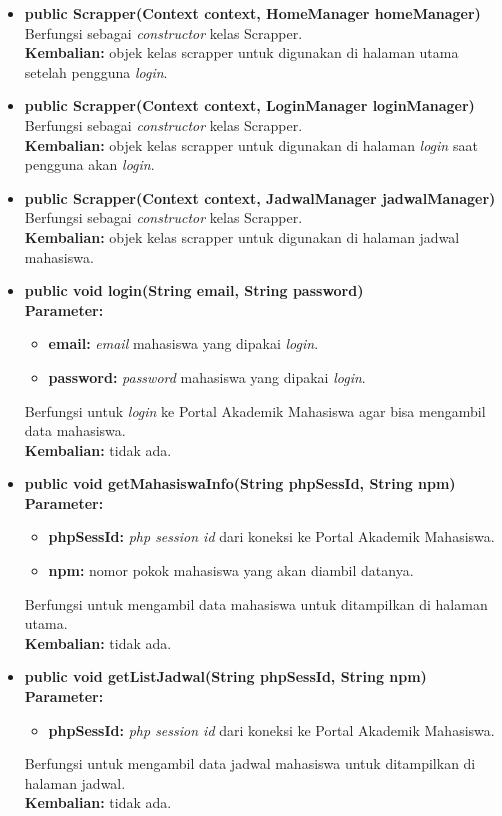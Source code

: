 \begin{enumerate}
\begin{itemize}
			\item \textbf{public Scrapper(Context context, HomeManager homeManager)}\\
				Berfungsi sebagai \textit{constructor} kelas Scrapper.\\
				\textbf{Kembalian:} objek kelas scrapper untuk digunakan di halaman utama setelah pengguna \textit{login}.
            \item \textbf{public Scrapper(Context context, LoginManager loginManager)}\\
				Berfungsi sebagai \textit{constructor} kelas Scrapper.\\
				\textbf{Kembalian:} objek kelas scrapper untuk digunakan di halaman \textit{login} saat pengguna akan \textit{login}.	
			\item \textbf{public Scrapper(Context context, JadwalManager jadwalManager)}\\
				Berfungsi sebagai \textit{constructor} kelas Scrapper.\\
				\textbf{Kembalian:} objek kelas scrapper untuk digunakan di halaman jadwal mahasiswa.
			\item \textbf{public void login(String email, String password)}\\
			\textbf{Parameter:}
				\begin{itemize}
					\item \textbf{email:} \textit{email} mahasiswa yang dipakai \textit{login}.
					\item \textbf{password:} \textit{password} mahasiswa yang dipakai \textit{login}.
				\end{itemize}
				Berfungsi untuk \textit{login} ke Portal Akademik Mahasiswa agar bisa mengambil data mahasiswa.\\
				\textbf{Kembalian:} tidak ada.
		    \item \textbf{public void getMahasiswaInfo(String phpSessId, String npm)}\\
			\textbf{Parameter:}
				\begin{itemize}
					\item \textbf{phpSessId:} \textit{php session id} dari koneksi ke Portal Akademik Mahasiswa.
					\item \textbf{npm:} nomor pokok mahasiswa yang akan diambil datanya.
				\end{itemize}
				Berfungsi untuk mengambil data mahasiswa untuk ditampilkan di halaman utama.\\
				\textbf{Kembalian:} tidak ada.
			\item \textbf{public void getListJadwal(String phpSessId, String npm)}\\
			\textbf{Parameter:}
				\begin{itemize}
					\item \textbf{phpSessId:} \textit{php session id} dari koneksi ke Portal Akademik Mahasiswa.
				\end{itemize}
				Berfungsi untuk mengambil data jadwal mahasiswa untuk ditampilkan di halaman jadwal.\\
				\textbf{Kembalian:} tidak ada.
		\end{itemize}
		

\end{enumerate}
